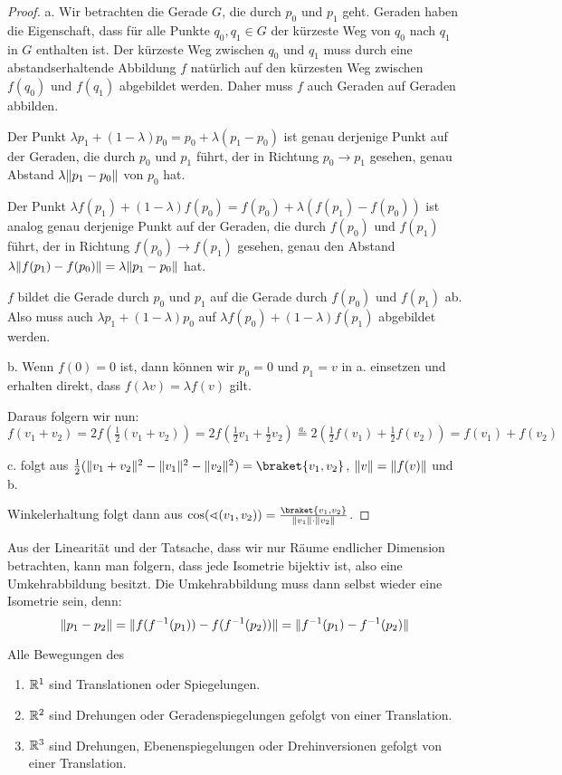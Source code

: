 \begin{proof}
a. Wir betrachten die Gerade $G$, die durch $p_0$ und $p_1$ geht. Geraden haben die Eigenschaft, dass für alle Punkte $q_0,q_1\in G$ der kürzeste Weg von $q_0$ nach $q_1$ in $G$ enthalten ist. Der kürzeste Weg zwischen $q_0$ und $q_1$ muss durch eine abstandserhaltende Abbildung $f$ natürlich auf den kürzesten Weg zwischen $f(q_0)$ und $f(q_1)$ abgebildet werden. Daher muss $f$ auch Geraden auf Geraden abbilden.

\smallbreak
Der Punkt $\lambda p_1+(1-\lambda)p_0 = p_0+\lambda(p_1-p_0)$ ist genau derjenige Punkt auf der Geraden, die durch $p_0$ und $p_1$ führt, der in Richtung $p_0 \to p_1$ gesehen, genau Abstand $\lambda\lVert p_1-p_0\rVert$ von $p_0$ hat.

Der Punkt $\lambda f(p_1) +(1-\lambda)f(p_0)=f(p_0) + \lambda(f(p_1)-f(p_0))$ ist analog genau derjenige Punkt auf der Geraden, die durch $f(p_0)$ und $f(p_1)$ führt, der in Richtung $f(p_0)\to f(p_1)$ gesehen, genau den Abstand $\lambda\lVert f(p_1)-f(p_0)\rVert = \lambda\lVert p_1-p_0\rVert$ hat.

\smallbreak
$f$ bildet die Gerade durch $p_0$ und $p_1$ auf die Gerade durch $f(p_0)$ und $f(p_1)$ ab. Also muss auch $\lambda p_1+(1-\lambda)p_0$ auf $\lambda f(p_0)+(1-\lambda)f(p_1)$ abgebildet werden.

\medbreak
b. Wenn $f(0)=0$ ist, dann können wir $p_0=0$ und $p_1=v$ in a. einsetzen und erhalten direkt, dass $f(\lambda v)=\lambda f(v)$ gilt.

Daraus folgern wir nun:
\[f(v_1+v_2) = 2f(\tfrac{1}{2}(v_1+v_2)) = 2f(\tfrac{1}{2}v_1 + \tfrac{1}{2}v_2) \overset{a.}{=} 2(\tfrac{1}{2}f(v_1)+\tfrac{1}{2}f(v_2))=f(v_1)+f(v_2)\]

\medbreak
c. folgt aus $\tfrac{1}{2}(\norm{v_1+v_2}^2-\norm{v_1}^2-\norm{v_2}^2)=\braket{v_1,v_2}$, $\lVert v\rVert=\lVert f(v)\rVert$ und b.

Winkelerhaltung folgt dann aus $\cos(\sphericalangle(v_1,v_2)) = \frac{\braket{v_1,v_2}}{\norm{v_1}\cdot\norm{v_2}}$.
\end{proof}

\begin{remark}
Aus der Linearität und der Tatsache, dass wir nur Räume endlicher Dimension betrachten, kann man folgern, dass jede Isometrie bijektiv ist, also eine Umkehrabbildung besitzt. Die Umkehrabbildung muss dann selbst wieder eine Isometrie sein, denn:
\[\lVert p_1-p_2\rVert = \lVert f(f^{-1}(p_1))-f(f^{-1}(p_2))\rVert = \lVert f^{-1}(p_1)-f^{-1}(p_2)\rVert\]
\end{remark}

\begin{theorem}
Alle Bewegungen des
\begin{enumerate}
\item $\mathbb{R}^1$ sind Translationen oder Spiegelungen.
\item $\mathbb{R}^2$ sind Drehungen oder Geradenspiegelungen gefolgt von einer Translation.
\item $\mathbb{R}^3$ sind Drehungen, Ebenenspiegelungen oder Drehinversionen gefolgt von einer Translation.
\end{enumerate}
\end{theorem}